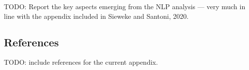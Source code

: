 \documentclass[nobib]{tufte-handout}
\newcommand{\todo}[1]{}
\renewcommand{\todo}[1]{{\color{RedOrange} TODO: {#1}}}
\begin{document}
\todo{Report the key aspects emerging from the NLP analysis --- very much in
line with the appendix included in Sieweke and Santoni, 2020.}

\begin{refsection}

\setcounter{table}{0}
\renewcommand{\thetable}{c\arabic{table}}
\renewcommand{\thefigure}{C\arabic{figure}}



\subsection{References}

\todo{include references for the current appendix.}

\printbibliography[heading=none]

\end{refsection}

\end{document}
